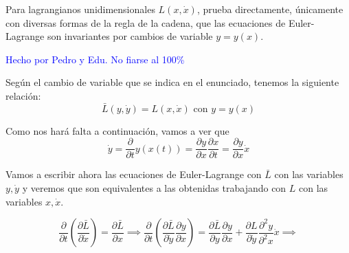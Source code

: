 \begin{problem}[15]
Para lagrangianos unidimensionales $L(x, \dot{x})$, prueba directamente, únicamente con diversas formas de la regla de la cadena, que las ecuaciones de Euler-Lagrange son invariantes por cambios de variable $y = y(x)$.

\solution
\textcolor{blue}{Hecho por Pedro y Edu. No fiarse al 100\%}

%
%
%
Según el cambio de variable que se indica en el enunciado, tenemos la siguiente relación:
\[\bar{L}(y,\dot y)=L(x, \dot x) \text{ con } y=y(x)\]

Como nos hará falta a continuación, vamos a ver que
\[\dot y = \frac{\partial}{\partial t} y(x(t))=\frac{\partial y}{\partial x} \frac{\partial x}{\partial t} = \frac{\partial y}{\partial x}  \dot x \]

Vamos a escribir ahora las ecuaciones de Euler-Lagrange con $\bar{L}$ con las variables $y, \dot y$ y veremos que son equivalentes a las obtenidas trabajando con $L$ con las variables $x, \dot x$.

\[\frac{\partial}{\partial t}\left(\frac{\partial \bar{L}}{\partial \dot x} \right)=\frac{\partial \bar{L}}{\partial x} \implies \frac{\partial}{\partial t} \left( \frac{\partial \bar{L}}{\partial \dot y}\frac{\partial y}{\partial x}\right) = \frac{\partial \bar{L}}{\partial y}\frac{\partial y}{\partial x}+\frac{\partial L}{\partial \dot y}\frac{\partial^2 y}{\partial^2 x}\dot x \implies \]


\end{problem}

